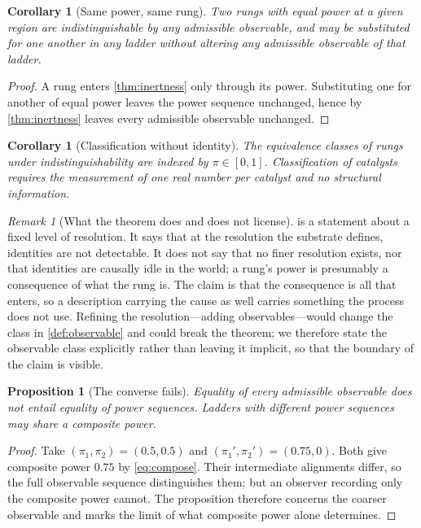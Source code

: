 \documentclass[11pt,twocolumn,a4paper]{article}
\theoremstyle{plain}
\newtheorem{proposition}[theorem]{Proposition}
\newtheorem{corollary}[theorem]{Corollary}
\theoremstyle{definition}
\theoremstyle{remark}
\newtheorem{remark}[theorem]{Remark}
\newcommand{\pow}{\pi}
\begin{document}
\begin{corollary}[Same power, same rung]
\label{cor:samerung}
Two rungs with equal power at a given region are indistinguishable by any
admissible observable, and may be substituted for one another in any ladder
without altering any admissible observable of that ladder.
\end{corollary}

\begin{proof}
A rung enters \cref{thm:inertness} only through its power. Substituting one for
another of equal power leaves the power sequence unchanged, hence by
\cref{thm:inertness} leaves every admissible observable unchanged.
\end{proof}

\begin{corollary}[Classification without identity]
\label{cor:classification}
The equivalence classes of rungs under indistinguishability are indexed by
$\pow \in [0,1]$. Classification of catalysts requires the measurement of one
real number per catalyst and no structural information.
\end{corollary}

\begin{remark}[What the theorem does and does not license]
\label{rem:scope}
 is a statement about a fixed level of resolution. It says
that at the resolution the substrate defines, identities are not detectable. It
does not say that no finer resolution exists, nor that identities are causally
idle in the world; a rung's power is presumably a consequence of what the rung
is. The claim is that the consequence is all that enters, so a description
carrying the cause as well carries something the process does not use. Refining
the resolution---adding observables---would change the class in
\cref{def:observable} and could break the theorem; we therefore state the
observable class explicitly rather than leaving it implicit, so that the
boundary of the claim is visible.
\end{remark}

\begin{proposition}[The converse fails]
\label{prop:converse}
Equality of every admissible observable does not entail equality of power
sequences. Ladders with different power sequences may share a composite power.
\end{proposition}

\begin{proof}
Take $(\pow_1,\pow_2) = (0.5, 0.5)$ and $(\pow_1',\pow_2') = (0.75, 0)$. Both
give composite power $0.75$ by \cref{eq:compose}. Their intermediate alignments
differ, so the full observable sequence distinguishes them; but an observer
recording only the composite power cannot. The proposition therefore
concerns the coarser observable and marks the limit of what composite power
alone determines.
\end{proof}
\end{document}
